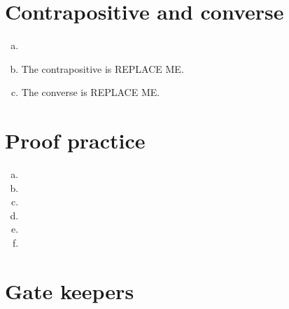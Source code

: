\documentclass{article}
\begin{document}
\section{Contrapositive and converse}
\begin{enumerate}[(a)]
    \item
    \item The contrapositive is REPLACE ME. %
    \item The converse is REPLACE ME. %
\end{enumerate}





\section{Proof practice}
\begin{enumerate}[(a)]
    \item
    \item
    \item
    \item
    \item
    \item
\end{enumerate}





\section{Gate keepers}






\end{document}
